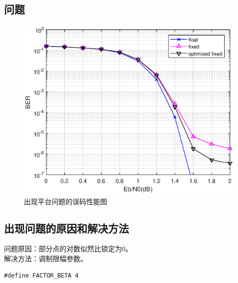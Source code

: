 \documentclass{article}
\begin{document}
\subsection{问题}
\begin{figure}[H]
	\centering
	\includegraphics[width = .8\textwidth]{err.eps}
	\caption{出现平台问题的误码性能图}
\end{figure}
\subsection{出现问题的原因和解决方法}
问题原因：部分点的对数似然比锁定为0。\\
解决方法：调制限幅参数。\\
\lstset{language=C++}
\begin{lstlisting}
#define FACTOR_BETA 4
\end{lstlisting}
\end{document}
